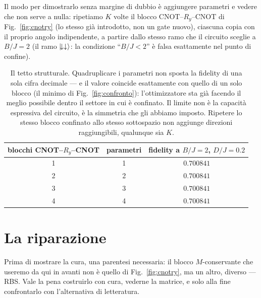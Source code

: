 \documentclass[11pt,a4paper]{article}
\begin{document}
Il modo per dimostrarlo senza margine di dubbio è aggiungere parametri e vedere
che non serve a nulla: ripetiamo $K$ volte il blocco CNOT--$R_y$--CNOT di
Fig.~\ref{fig:cnotry} (lo stesso già introdotto, non un gate nuovo), ciascuna
copia con il proprio angolo indipendente, a partire dallo stesso ramo che il
circuito sceglie a $B/J=2$ (il ramo $\lvert \!\downarrow\downarrow\rangle$: la
condizione ``$B/J<2$'' è falsa esattamente nel punto di confine).

\begin{table}[htbp]
\centering
\small
\renewcommand{\arraystretch}{1.3}
\begin{tabular}{@{}ccc@{}}
\toprule
\rowcolor{grigetto}
\textbf{blocchi CNOT--$R_y$--CNOT} & \textbf{parametri} & \textbf{fidelity a $B/J=2$, $D/J=0.2$} \\
\midrule
1 & 1 & $0.700841$ \\
2 & 2 & $0.700841$ \\
3 & 3 & $0.700841$ \\
4 & 4 & $0.700841$ \\
\bottomrule
\end{tabular}
\caption{Il tetto strutturale. Quadruplicare i parametri non sposta la fidelity
di una sola cifra decimale --- e il valore coincide esattamente con quello di
un solo blocco (il minimo di Fig.~\ref{fig:confronto}): l'ottimizzatore sta già
facendo il meglio possibile dentro il settore in cui è confinato. Il limite non
è la capacità espressiva del circuito, è la simmetria che gli abbiamo imposto.
Ripetere lo stesso blocco confinato allo stesso sottospazio non aggiunge
direzioni raggiungibili, qualunque sia $K$.}
\label{tab:tetto}
\end{table}

\FloatBarrier


\section{La riparazione}
\label{sec:riparazione}
\label{sec:rbs-vs-w}

Prima di mostrare la cura, una parentesi necessaria: il blocco $M$-conservante
che useremo da qui in avanti non è quello di Fig.~\ref{fig:cnotry}, ma un altro,
diverso --- RBS. Vale la pena costruirlo con cura, vederne la matrice, e solo
alla fine confrontarlo con l'alternativa di letteratura.
\end{document}
